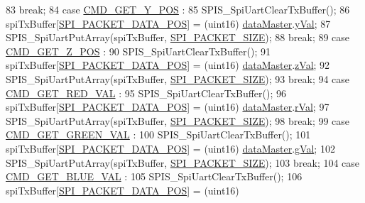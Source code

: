 \begin{DoxyCode}
{{83           \textcolor{keywordflow}{break};
84         \textcolor{keywordflow}{case} \hyperlink{handler_8h_a51053e5251048d6ebbf4d2e23de40761}{CMD\_GET\_Y\_POS} :
85           SPIS\_SpiUartClearTxBuffer();
86           spiTxBuffer[\hyperlink{spi_8h_a5ffe58623f478b7b960a1349530a6655}{SPI\_PACKET\_DATA\_POS}] = (uint16)
      \hyperlink{data_8h_a6b1a8871e30b304a6f5764c44d89e489}{dataMaster}.\hyperlink{data_8h_a28e89368b5a1aee30ccd952ad63e8c55}{yVal};
87           SPIS\_SpiUartPutArray(spiTxBuffer, \hyperlink{spi_8h_aea54fc09a960e5a1b7096374f3eebee4}{SPI\_PACKET\_SIZE});
88           \textcolor{keywordflow}{break};
89         \textcolor{keywordflow}{case} \hyperlink{handler_8h_a4d76e78d09a00f75609569d9aa92ab98}{CMD\_GET\_Z\_POS} :
90           SPIS\_SpiUartClearTxBuffer();
91           spiTxBuffer[\hyperlink{spi_8h_a5ffe58623f478b7b960a1349530a6655}{SPI\_PACKET\_DATA\_POS}] = (uint16)
      \hyperlink{data_8h_a6b1a8871e30b304a6f5764c44d89e489}{dataMaster}.\hyperlink{data_8h_a767a084c35fdc0f1e3e41972d5415483}{zVal};
92           SPIS\_SpiUartPutArray(spiTxBuffer, \hyperlink{spi_8h_aea54fc09a960e5a1b7096374f3eebee4}{SPI\_PACKET\_SIZE});
93           \textcolor{keywordflow}{break};
94         \textcolor{keywordflow}{case} \hyperlink{handler_8h_aa2f09e60c4eeae4560da88c6b1b08c60}{CMD\_GET\_RED\_VAL} :
95           SPIS\_SpiUartClearTxBuffer();
96           spiTxBuffer[\hyperlink{spi_8h_a5ffe58623f478b7b960a1349530a6655}{SPI\_PACKET\_DATA\_POS}] = (uint16)
      \hyperlink{data_8h_a6b1a8871e30b304a6f5764c44d89e489}{dataMaster}.\hyperlink{data_8h_a3bf14030a39e71a91c0b97a624f95c5d}{rVal};
97           SPIS\_SpiUartPutArray(spiTxBuffer, \hyperlink{spi_8h_aea54fc09a960e5a1b7096374f3eebee4}{SPI\_PACKET\_SIZE});
98           \textcolor{keywordflow}{break};
99         \textcolor{keywordflow}{case} \hyperlink{handler_8h_a55d24f50aeb52afddd491d97a66c81ef}{CMD\_GET\_GREEN\_VAL} :
100           SPIS\_SpiUartClearTxBuffer();
101           spiTxBuffer[\hyperlink{spi_8h_a5ffe58623f478b7b960a1349530a6655}{SPI\_PACKET\_DATA\_POS}] = (uint16)
      \hyperlink{data_8h_a6b1a8871e30b304a6f5764c44d89e489}{dataMaster}.\hyperlink{data_8h_ae02d0c792549f1b88e80ae6eb117f2be}{gVal};
102           SPIS\_SpiUartPutArray(spiTxBuffer, \hyperlink{spi_8h_aea54fc09a960e5a1b7096374f3eebee4}{SPI\_PACKET\_SIZE});
103           \textcolor{keywordflow}{break};
104         \textcolor{keywordflow}{case} \hyperlink{handler_8h_a81052c67f996705d7eacfcea66bdde08}{CMD\_GET\_BLUE\_VAL} :
105           SPIS\_SpiUartClearTxBuffer();
106           spiTxBuffer[\hyperlink{spi_8h_a5ffe58623f478b7b960a1349530a6655}{SPI\_PACKET\_DATA\_POS}] = (uint16)
}}
\end{DoxyCode}
